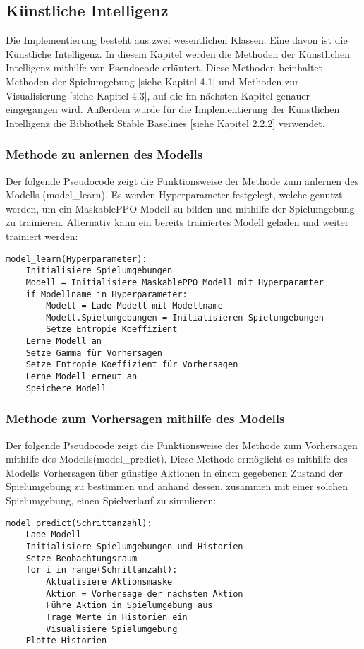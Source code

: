\subsection{Künstliche Intelligenz}
Die Implementierung besteht aus zwei wesentlichen Klassen. Eine davon ist die Künstliche Intelligenz. In diesem Kapitel werden die Methoden der Künstlichen Intelligenz mithilfe von Pseudocode erläutert. Diese Methoden beinhaltet Methoden der Spielumgebung [siehe Kapitel 4.1] und Methoden zur Visualisierung [siehe Kapitel 4.3], auf die im nächsten Kapitel genauer eingegangen wird. Außerdem wurde für die Implementierung der Künstlichen Intelligenz die Bibliothek Stable Baselines [siehe Kapitel 2.2.2] verwendet.
\subsubsection{Methode zu anlernen des Modells}
\begin{minipage}{\linewidth}
Der folgende Pseudocode zeigt die Funktionsweise der Methode zum anlernen des Modells (model\_learn). Es werden Hyperparameter festgelegt, welche genutzt werden, um ein MaskablePPO Modell zu bilden und mithilfe der Spielumgebung zu trainieren. Alternativ kann ein bereits trainiertes Modell geladen und weiter trainiert werden:
\vspace{0.5cm}
\begin{lstlisting}[caption={Methode zu anlernen des Modells}]
model_learn(Hyperparameter):
	Initialisiere Spielumgebungen
	Modell = Initialisiere MaskablePPO Modell mit Hyperparamter
	if Modellname in Hyperparameter:
		Modell = Lade Modell mit Modellname
		Modell.Spielumgebungen = Initialisieren Spielumgebungen
		Setze Entropie Koeffizient
	Lerne Modell an
	Setze Gamma für Vorhersagen
	Setze Entropie Koeffizient für Vorhersagen
	Lerne Modell erneut an
	Speichere Modell
\end{lstlisting}
\end{minipage}
\subsubsection{Methode zum Vorhersagen mithilfe des Modells}
\begin{minipage}{\linewidth}
Der folgende Pseudocode zeigt die Funktionsweise der Methode zum Vorhersagen mithilfe des Modells(model\_predict). Diese Methode ermöglicht es mithilfe des Modells Vorhersagen über günstige Aktionen in einem gegebenen Zustand der Spielumgebung zu bestimmen und anhand dessen, zusammen mit einer solchen Spielumgebung, einen Spielverlauf zu simulieren:
\vspace{0.5cm}
\begin{lstlisting}[caption={Methode zum Vorhersagen mithilfe des Modells}]
model_predict(Schrittanzahl):
	Lade Modell
	Initialisiere Spielumgebungen und Historien
	Setze Beobachtungsraum
	for i in range(Schrittanzahl):
		Aktualisiere Aktionsmaske
		Aktion = Vorhersage der nächsten Aktion
		Führe Aktion in Spielumgebung aus
		Trage Werte in Historien ein
		Visualisiere Spielumgebung
	Plotte Historien
\end{lstlisting}
\end{minipage}

